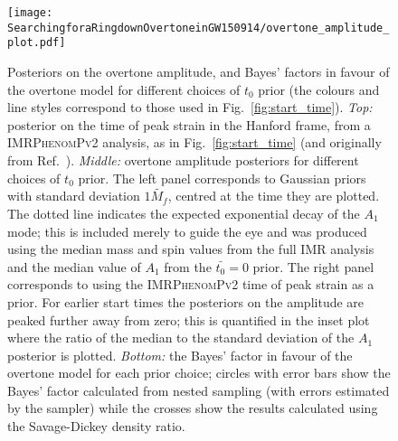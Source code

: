 \begin{figure}[t!]
    \centering
    \texttt{[image: SearchingforaRingdownOvertoneinGW150914/overtone\_amplitude\_plot.pdf]}
    \caption[Posteriors on the GW150914 overtone amplitude and Bayes' factors in favour of the overtone model for different choices of the ringdown start-time prior]{ 
    Posteriors on the overtone amplitude, and Bayes' factors in favour of the overtone model for different choices of $t_0$ prior (the colours and line styles correspond to those used in Fig.~\ref{fig:start_time}).
    \emph{Top:} posterior on the time of peak strain in the Hanford frame, from a \textsc{IMRPhenomPv2} analysis, as in Fig.~\ref{fig:start_time} (and originally from Ref.~\cite{Isi:2022mhy}). 
    \emph{Middle:} overtone amplitude posteriors for different choices of $t_0$ prior. The left panel corresponds to Gaussian priors with standard deviation $1\tilde{M_f}$, centred at the time they are plotted.
    The dotted line indicates the expected exponential decay of the $A_1$ mode; this is included merely to guide the eye and was produced using the median mass and spin values from the full IMR analysis and the median value of $A_1$ from the $\bar{t_0} = 0$ prior.
    The right panel corresponds to using the \textsc{IMRPhenomPv2} time of peak strain as a prior.
    For earlier start times the posteriors on the amplitude are peaked further away from zero; this is quantified in the inset plot where the ratio of the median to the standard deviation of the $A_1$ posterior is plotted.
    \emph{Bottom:} the Bayes' factor in favour of the overtone model for each prior choice; circles with error bars show the Bayes' factor calculated from nested sampling (with errors estimated by the sampler) while the crosses show the results calculated using the Savage-Dickey density ratio.
    }
    \label{fig:overtone_amplitude}
\end{figure}

